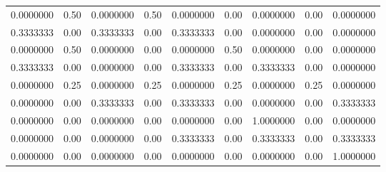 \documentclass[11pt]{article}
\begin{document}
    \begin{tabular}{lllllllll}
	 0.0000000 & 0.50      & 0.0000000 & 0.50      & 0.0000000 & 0.00      & 0.0000000 & 0.00      & 0.0000000\\
	 0.3333333 & 0.00      & 0.3333333 & 0.00      & 0.3333333 & 0.00      & 0.0000000 & 0.00      & 0.0000000\\
	 0.0000000 & 0.50      & 0.0000000 & 0.00      & 0.0000000 & 0.50      & 0.0000000 & 0.00      & 0.0000000\\
	 0.3333333 & 0.00      & 0.0000000 & 0.00      & 0.3333333 & 0.00      & 0.3333333 & 0.00      & 0.0000000\\
	 0.0000000 & 0.25      & 0.0000000 & 0.25      & 0.0000000 & 0.25      & 0.0000000 & 0.25      & 0.0000000\\
	 0.0000000 & 0.00      & 0.3333333 & 0.00      & 0.3333333 & 0.00      & 0.0000000 & 0.00      & 0.3333333\\
	 0.0000000 & 0.00      & 0.0000000 & 0.00      & 0.0000000 & 0.00      & 1.0000000 & 0.00      & 0.0000000\\
	 0.0000000 & 0.00      & 0.0000000 & 0.00      & 0.3333333 & 0.00      & 0.3333333 & 0.00      & 0.3333333\\
	 0.0000000 & 0.00      & 0.0000000 & 0.00      & 0.0000000 & 0.00      & 0.0000000 & 0.00      & 1.0000000\\
\end{tabular}
\end{document}
